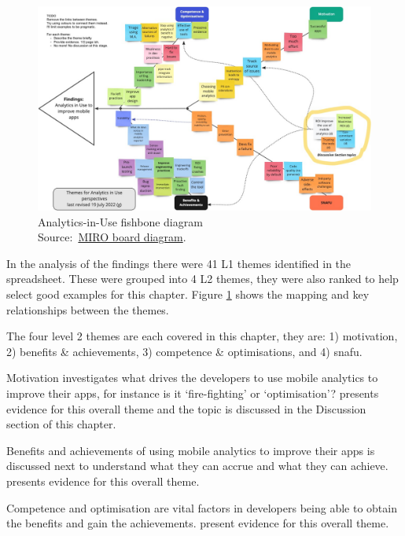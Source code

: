 \begin{figure}
    \centering
    \includegraphics[width=\linewidth]{images/rough-sketches/analytics-in-use-fishbone-diagram-19-jul-2022g.jpeg}
    \caption{Analytics-in-Use fishbone diagram\\Source:~\href{https://miro.com/app/board/uXjVOlelPDU=/?share_link_id=219460632025}{MIRO board diagram}.}
    \label{fig:analytics-in-use-fishbone-diagram}
\end{figure}

In the analysis of the findings there were 41 L1 themes identified in the spreadsheet. These were grouped into  4 L2 themes, they were also ranked to help select good examples for this chapter. Figure \ref{fig:analytics-in-use-fishbone-diagram} shows the mapping and key relationships between the themes.

The four level 2 themes are each covered in this chapter, they are: 1) motivation, 2) benefits \& achievements, 3) competence \& optimisations, and 4) \Gls{snafu}.

Motivation investigates what drives the developers to use mobile analytics to improve their apps, for instance is it `fire-fighting' or `optimisation'?  presents evidence for this overall theme and the topic is discussed in the Discussion section of this chapter.

Benefits and achievements of using mobile analytics to improve their apps is discussed next to understand what they can accrue and what they can achieve.  presents evidence for this overall theme.

Competence and optimisation are vital factors in developers being able to obtain the benefits and gain the achievements.  present evidence for this overall theme.

